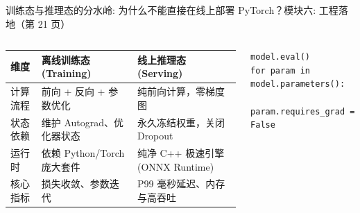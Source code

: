 \documentclass[aspectratio=169,9pt]{beamer}
\begin{document}
\begin{frame}[fragile]{训练态与推理态的分水岭: 为什么不能直接在线上部署 PyTorch？}{模块六: 工程落地（第 21 页）}
\begin{columns}[T]
    {\scriptsize
    \setlength{\tabcolsep}{3pt}       %
    \renewcommand{\arraystretch}{1.2} %
    \begin{tabular}{@{}p{1.1cm}p{2.2cm}p{2.5cm}@{}}
        \toprule
        \textbf{维度} & \textbf{离线训练态 (Training)} & \textbf{线上推理态 (Serving)} \\
        \midrule
        计算流程 & 前向 + 反向 + 参数优化     & 纯前向计算，零梯度图 \\
        状态依赖 & 维护 Autograd、优化器状态 & 永久冻结权重，关闭 Dropout \\
        运行时   & 依赖 Python/Torch 庞大套件 & 纯净 C++ 极速引擎 (ONNX Runtime) \\
        核心指标 & 损失收敛、参数迭代         & P99 毫秒延迟、内存与高吞吐 \\
        \bottomrule 
    \end{tabular}
    }
    \vspace{2mm}
\begin{lstlisting}
model.eval()
for param in model.parameters():
    param.requires_grad = False
\end{lstlisting}
\end{columns}
\end{frame}
\end{document}
